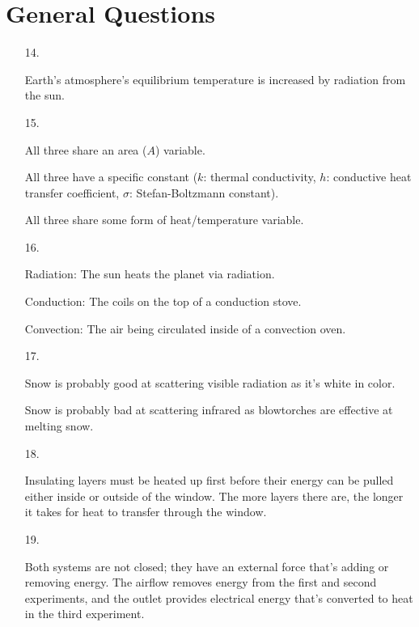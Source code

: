 ﻿\documentclass[12pt, letterpaper]{article}
\begin{document}
    \section*{General Questions}

    \begin{enumerate}
        \item [14.]\mbox{}
        \begin{mdframed}
            Earth's atmosphere's equilibrium temperature is increased by radiation from the sun.
        \end{mdframed}

        \item [15.]\mbox{}
        \begin{mdframed}
            All three share an area ($A$) variable.
            
            All three have a specific constant ($k$: thermal conductivity, $h$: conductive heat transfer coefficient, $\sigma$: Stefan-Boltzmann constant).

            All three share some form of heat/temperature variable.
        \end{mdframed}

        \item [16.]\mbox{}
        \begin{mdframed}
            Radiation: The sun heats the planet via radiation.

            Conduction: The coils on the top of a conduction stove.

            Convection: The air being circulated inside of a convection oven.
        \end{mdframed}

        \item [17.]\mbox{}
        \begin{mdframed}
            Snow is probably good at scattering visible radiation as it's white in color.

            Snow is probably bad at scattering infrared as blowtorches are effective at melting snow.
        \end{mdframed}

        \item [18.]\mbox{}
        \begin{mdframed}
            Insulating layers must be heated up first before their energy can be pulled either inside or outside of the window. The more layers there are, the longer it takes for heat to transfer through the window.
        \end{mdframed}

        \item [19.]\mbox{}
        \begin{mdframed}
            Both systems are not closed; they have an external force that's adding or removing energy. The airflow removes energy from the first and second experiments, and the outlet provides electrical energy that's converted to heat in the third experiment.
        \end{mdframed}
    \end{enumerate}
\end{document}

